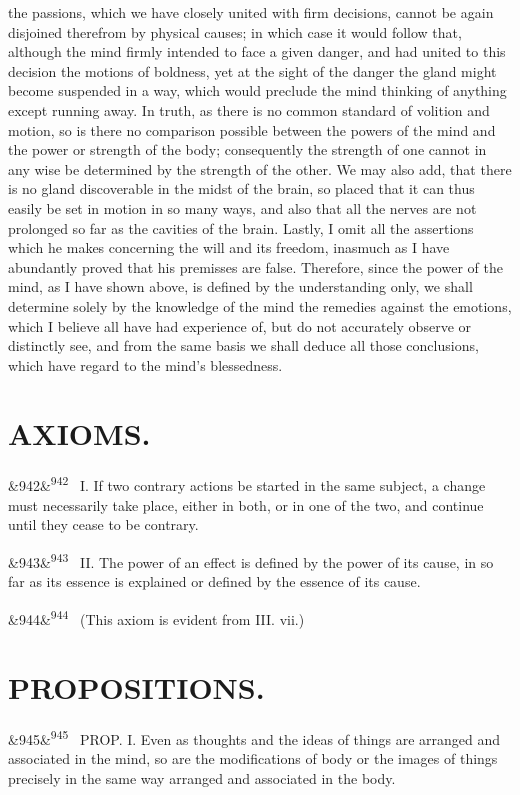 \documentclass[12pt]{article}
\newcommand{\para}[1][]{\par\noindent\ifx&#1&\else\textsuperscript{\footnotesize #1}~\fi}
\begin{document}
the passions, which we have closely united with firm decisions, cannot be again disjoined therefrom by physical causes; in which case it would follow that, although the mind firmly intended to face a given danger, and had united to this decision the motions of boldness, yet at the sight of the danger the gland might become suspended in a way, which would preclude the mind thinking of anything except running away. In truth, as there is no common standard of volition and motion, so is there no comparison possible between the powers of the mind and the power or strength of the body; consequently the strength of one cannot in any wise be determined by the strength of the other. We may also add, that there is no gland discoverable in the midst of the brain, so placed that it can thus easily be set in motion in so many ways, and also that all the nerves are not prolonged so far as the cavities of the brain. Lastly, I omit all the assertions which he makes concerning the will and its freedom, inasmuch as I have abundantly proved that his premisses are false. Therefore, since the power of the mind, as I have shown above, is defined by the understanding only, we shall determine solely by the knowledge of the mind the remedies against the emotions, which I believe all have had experience of, but do not accurately observe or distinctly see, and from the same basis we shall deduce all those conclusions, which have regard to the mind's blessedness.

\section*{AXIOMS.}

\para[942] I. If two contrary actions be started in the same subject, a change must necessarily take place, either in both, or in one of the two, and continue until they cease to be contrary.

\para[943] II. The power of an effect is defined by the power of its cause, in so far as its essence is explained or defined by the essence of its cause.

\para[944] (This axiom is evident from III. vii.)

\section*{PROPOSITIONS.}

\para[945] PROP. I. Even as thoughts and the ideas of things are arranged and associated in the mind, so are the modifications of body or the images of things precisely in the same way arranged and associated in the body.
\end{document}
